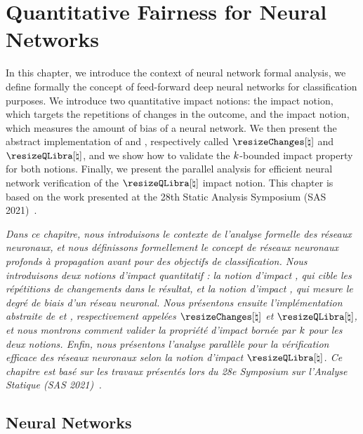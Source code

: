 \chapter{Quantitative Fairness for Neural Networks}

In this chapter, we introduce the context of neural network formal analysis, we define formally the concept of feed-forward deep neural networks for classification purposes.
We introduce two quantitative impact notions: the \changesname{} impact notion, which targets the repetitions of changes in the outcome, and the \qlibraname{} impact notion, which measures the amount of bias of a neural network. We then present the abstract implementation of \changesname{} and \qlibraname{}, respectively called $\abstractchangesname$ and $\abstractqlibraname$, and we show how to validate the $k$-bounded impact property for both notions. Finally, we present the parallel analysis for efficient neural network verification of the $\abstractqlibraname$ impact notion.
This chapter is based on the work presented at the 28th Static Analysis Symposium (SAS 2021)~\cite{Mazzucato2021}.

\emph{Dans ce chapitre, nous introduisons le contexte de l'analyse formelle des réseaux neuronaux, et nous définissons formellement le concept de réseaux neuronaux profonds à propagation avant pour des objectifs de classification.
Nous introduisons deux notions d'impact quantitatif : la notion d'impact \changesname{}, qui cible les répétitions de changements dans le résultat, et la notion d'impact \qlibraname{}, qui mesure le degré de biais d'un réseau neuronal. Nous présentons ensuite l'implémentation abstraite de \changesname{} et \qlibraname{}, respectivement appelées $\abstractchangesname$ et $\abstractqlibraname$, et nous montrons comment valider la propriété d'impact bornée par $k$ pour les deux notions. Enfin, nous présentons l'analyse parallèle pour la vérification efficace des réseaux neuronaux selon la notion d'impact $\abstractqlibraname$.
Ce chapitre est basé sur les travaux présentés lors du 28e Symposium sur l'Analyse Statique (SAS 2021)~.}

% 
% 
% 
% 
% 

\section{Neural Networks}

